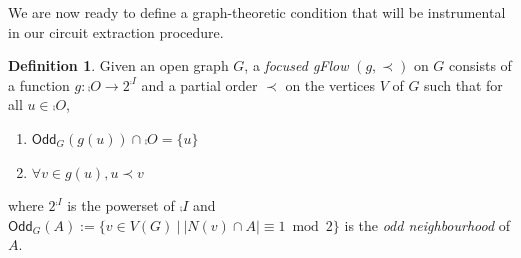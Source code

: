 \documentclass[a4paper,onecolumn,superscriptaddress,11pt,accepted=2020-04-27]{quantumarticle}
\newcommand{\odd}[2]{\textsf{Odd}_{#1}\left(#2\right)}
\theoremstyle{definition}
\newtheorem{definition}[theorem]{Definition}
\begin{document}
We are now ready to define a graph-theoretic condition that will be instrumental in our circuit extraction procedure.


\begin{definition}{\cite{mhalla2011graph}}\label{def:gflow}
Given an open graph $G$, a \emph{focused gFlow} $(g,\prec)$ on $G$
consists of a function $g:\comp O \to 2^{\comp I}$ and a partial order $\prec$
on the vertices $V$ of $G$ such that for all $u\in \comp O$, 
\begin{enumerate} 
\item $\odd G {g(u)}\cap \comp O = \{u\}$
\item  $\forall v\in g(u), u\prec v$
\end{enumerate}
where $2^{\comp I}$ is the powerset of $\comp I$ and $\odd G A:=\{v\in V(G)~|~|N(v)\cap A| \equiv 1\bmod 2\}$ is the \emph{odd neighbourhood} of $A$.
\end{definition}
\end{document}
